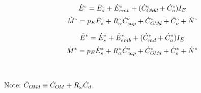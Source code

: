 

\begin{landscape}

\linespread{1}


\sectionsep{}

{
\begin{equation} \label{eq:E_acct_orig}
  \Eacctorig{}
\end{equation}
}
{
\begin{equation} \label{eq:M_acct_orig}
  \Macctorig{}
\end{equation}
}

\sectionsep{}

{
\begin{equation} \label{eq:E_acct_aemp}
  \Eacctaempl{}
\end{equation}
}
{
\begin{equation} \label{eq:M_acct_aemp}
  \Macctaempl{}
\end{equation}
}

\sectionsep{}

\derivsection{}
{
~

Note: $\rate{C}_{\omd} \equiv \rate{C}_{\om} + R_{\omega} \rate{C}_d$.

}
\end{landscape}
